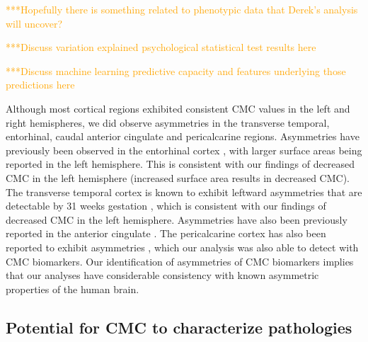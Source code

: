 \documentclass{article}
\begin{document}
%
%

\textcolor{orange}{%
***Hopefully there is something related to phenotypic data that Derek's
analysis will uncover?
}

\textcolor{orange}{%
***Discuss variation explained psychological statistical test results here
}

\textcolor{orange}{%
***Discuss machine learning predictive capacity and features underlying those
predictions here
}

Although most cortical regions exhibited consistent CMC values in the left
and right hemispheres, we did observe asymmetries in the transverse temporal,
entorhinal, caudal anterior cingulate and pericalcarine regions. Asymmetries
have previously been observed in the entorhinal cortex
\citep{simicHemisphericAsymmetryModular2005}, with larger surface areas being
reported in the left hemisphere. This is consistent with our findings of
decreased CMC in the left hemisphere (increased surface area results in
decreased CMC). The transverse temporal cortex is known to exhibit leftward
asymmetries that are detectable by 31 weeks gestation
\citep{chiLeftRightAsymmetriesTemporal1977}, which is consistent with our
findings of decreased CMC in the left hemisphere. Asymmetries have also been
previously reported in the anterior cingulate
\citep{yanHemisphericAsymmetryCognitive2009}. The pericalcarine cortex has
also been reported to exhibit asymmetries
\citep{chiarelloStructuralAsymmetryHuman2016,koelkebeckContributionCorticalThickness2014},
which our analysis was also able to detect with CMC biomarkers. Our
identification of asymmetries of CMC biomarkers implies that our analyses
have considerable consistency with known asymmetric properties of the human
brain.

\subsection{Potential for CMC to characterize pathologies}
\end{document}

